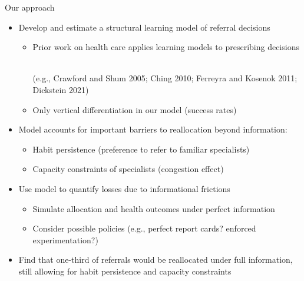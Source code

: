 \documentclass[slides, aspectratio=169]{beamer}
\newcommand{\bit}{\begin{itemize}}
\newcommand{\eit}{\end{itemize}}
\begin{document}
\begin{frame}{Our approach} \label{approach}
\begin{itemize}

\item Develop and estimate a structural learning model of referral decisions
\bit
    \item Prior work on health care applies learning models to prescribing decisions \  
    \hyperlink{literature}{}\\
    \parbox{\linewidth}{\footnotesize (e.g., Crawford and Shum 2005; Ching 2010; Ferreyra and Kosenok 2011; Dickstein 2021)} %
    \item Only vertical differentiation in our model (success rates)
\eit
\medskip 


\item Model accounts for important barriers to reallocation beyond information:
\bit
    \item Habit persistence (preference to refer to familiar specialists)
    \item Capacity constraints of specialists (congestion effect)
\eit
\medskip \pause


\item Use model to quantify losses due to informational frictions
\bit
    \item Simulate allocation and health outcomes under perfect information
    \item Consider possible policies (e.g., perfect report cards? enforced experimentation?)
\eit
\medskip

\item Find that one-third of referrals would be reallocated under full information, \\
still allowing for habit persistence and capacity constraints

\end{itemize}
\end{frame}
\end{document}
